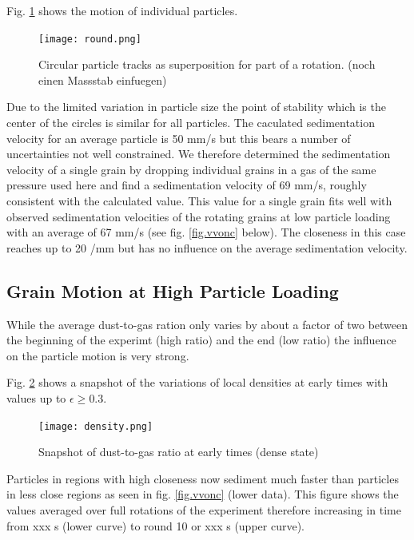 Fig. \ref{fig.circles} shows the motion of individual particles.
\begin{figure}[h]
\texttt{[image: round.png]}
    \caption{\label{fig.circles} Circular particle tracks as superposition for part of a rotation. (noch einen Massstab einfuegen)}
\end{figure}
Due to the limited variation in particle size the point of stability which
is the center of the circles is similar for all particles.
The caculated sedimentation velocity for an average particle is 50 mm/s but this bears a number of uncertainties not well constrained. We therefore determined the sedimentation velocity of a single grain by dropping individual grains in a gas of the same pressure used here and find a sedimentation velocity of 69 mm/s, roughly consistent with the calculated value. This value for a single grain fits well with observed sedimentation velocities of the rotating grains at low particle loading with an average of 
67 mm/s (see fig. \ref{fig.vvonc} below). 
The closeness in this case reaches up to 20 /mm but has no influence on the average sedimentation velocity.

\subsection{Grain Motion at High Particle Loading}

While the average dust-to-gas ration only varies by about a factor of two between 
the beginning of the experimt (high ratio) and the end (low ratio) the influence on the particle motion is very strong.

Fig. \ref{fig.dtog2} shows a snapshot of the variations of local densities at early times with values up to $\epsilon \geq 0.3$.

\begin{figure}[h]
\texttt{[image: density.png]}
    \caption{\label{fig.dtog2}Snapshot of dust-to-gas ratio at early times (dense state)}
\end{figure}

Particles in regions with high closeness now sediment much faster than particles in less
close regions as seen in fig. \ref{fig.vvonc} (lower data). This figure shows the values averaged over full rotations of the experiment therefore increasing in time from xxx s 
(lower curve) to round 10 or xxx s (upper curve).


